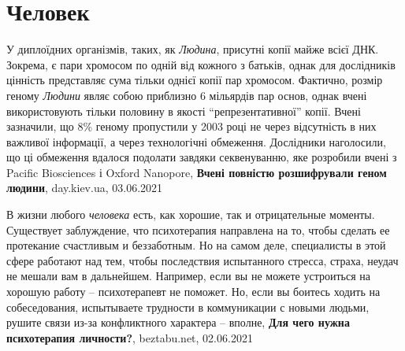  
 
 
 
 
\chapter{Человек}

У диплоїдних організмів, таких, як \emph{Людина}, присутні копії майже всієї
ДНК.  Зокрема, є пари хромосом по одній від кожного з батьків, однак для
дослідників цінність представляє сума тільки однієї копії пар хромосом.
Фактично, розмір геному \emph{Людини} являє собою приблизно 6 мільярдів пар
основ, однак вчені використовують тільки половину в якості
\enquote{репрезентативної} копії.  Вчені зазначили, що 8\% геному пропустили у
2003 році не через відсутність в них важливої інформації, а через технологічні
обмеження. Дослідники наголосили, що ці обмеження вдалося подолати завдяки
секвенуванню, яке розробили вчені з Pacific Biosciences і Oxford Nanopore,
\textbf{Вчені повністю розшифрували геном людини}, day.kiev.ua, 03.06.2021

В жизни любого \emph{человека} есть, как хорошие, так и отрицательные моменты.
Существует заблуждение, что психотерапия направлена на то, чтобы сделать ее
протекание счастливым и беззаботным. Но на самом деле, специалисты в этой сфере
работают над тем, чтобы последствия испытанного стресса, страха, неудач не
мешали вам в дальнейшем. Например, если вы не можете устроиться на хорошую
работу – психотерапевт не поможет. Но, если вы боитесь ходить на собеседования,
испытываете трудности в коммуникации с новыми людьми, рушите связи из-за
конфликтного характера – вполне,
\textbf{Для чего нужна психотерапия личности?}, beztabu.net, 02.06.2021

